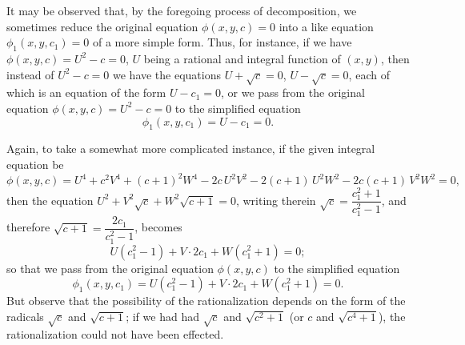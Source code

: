 \documentclass[11pt,a4paper]{article}
\begin{document}
It may be observed that, by the foregoing process of decomposition, we
sometimes reduce the original equation $\phi(x, y, c) = 0$ into a like equation
$\phi_1(x, y, c_1) = 0$ of a more simple form.  Thus, for instance, if we have
$\phi(x, y, c) = U^2 - c = 0$, $U$ being a rational and integral function of
$(x, y)$, then instead of $U^2 - c = 0$ we have the equations
$U + \sqrt{c} = 0$, $U - \sqrt{c} = 0$, each of which is an equation of the
form $U - c_1 = 0$, or we pass from the original equation
$\phi(x, y, c) = U^2 - c = 0$ to the simplified equation
\[
\phi_1(x, y, c_1) = U - c_1 = 0.
\]

Again, to take a somewhat more complicated instance, if the given integral
equation be
\[
\phi(x, y, c) = U^4 + c^2 V^4 + (c+1)^2 W^4
- 2c\,U^2 V^2 - 2(c+1)\,U^2 W^2 - 2c(c+1)\,V^2 W^2 = 0,
\]
then the equation $U^2 + V^2\sqrt{c} + W^2\sqrt{c+1} = 0$, writing therein
$\sqrt{c} = \dfrac{c_1^2 + 1}{c_1^2 - 1}$, and therefore
$\sqrt{c+1} = \dfrac{2 c_1}{c_1^2 - 1}$, becomes
\[
U(c_1^2 - 1) + V \cdot 2 c_1 + W(c_1^2 + 1) = 0;
\]
so that we pass from the original equation $\phi(x, y, c)$ to the simplified
equation
\[
\phi_1(x, y, c_1) = U(c_1^2 - 1) + V \cdot 2 c_1 + W(c_1^2 + 1) = 0.
\]
But observe that the possibility of the rationalization depends on the form of
the radicals $\sqrt{c}$ and $\sqrt{c+1}$; if we had had $\sqrt{c}$ and
$\sqrt{c^2+1}$ (or $c$ and $\sqrt{c^4+1}$), the rationalization could not have
been effected.
\end{document}
